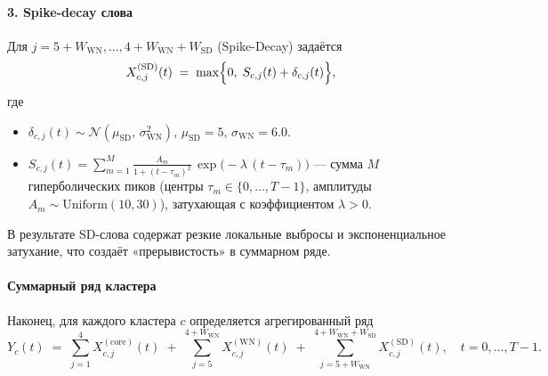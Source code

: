 \documentclass[14pt,a4paper]{article}
\begin{document}
\paragraph{3. Spike-decay слова} 
Для \(j = 5+W_{\mathrm{WN}},\dots,4+W_{\mathrm{WN}}+W_{\mathrm{SD}}\) (Spike-Decay) задаётся
\[
  X_{c,j}^{(\mathrm{SD})}(t)
  \;=\;
  \max\Bigl\{0,\;S_{c,j}(t) + \delta_{c,j}(t)\Bigr\},
\]
где 
\begin{itemize}
  \item \(\delta_{c,j}(t)\sim \mathcal{N}(\mu_{\mathrm{SD}},\,\sigma_{\mathrm{WN}}^2)\), 
    \(\mu_{\mathrm{SD}}=5, \,\sigma_{\mathrm{WN}}=6.0.\)
  \item \(S_{c,j}(t) = \displaystyle\sum_{m=1}^M \frac{A_m}{1 + (t-\tau_m)^2}\,\exp\bigl(-\lambda\,(t-\tau_m)\bigr)\) —
    сумма \(M\) гиперболических пиков (центры \(\tau_m\in\{0,\dots,T-1\}\), амплитуды \(A_m\sim\mathrm{Uniform}(10,30)\)), 
    затухающая с коэффициентом \(\lambda>0\).  
\end{itemize}
В результате SD-слова содержат резкие локальные выбросы и экспоненциальное затухание, что создаёт «прерывистость» в суммарном ряде.

\paragraph{Суммарный ряд кластера} 
Наконец, для каждого кластера \(c\) определяется агрегированный ряд
\[
  Y_c(t)
  \;=\;
  \sum_{j=1}^{4} X_{c,j}^{(\mathrm{core})}(t)
  \;+\;
  \sum_{j=5}^{4+W_{\mathrm{WN}}} X_{c,j}^{(\mathrm{WN})}(t)
  \;+\;
  \sum_{j=5+W_{\mathrm{WN}}}^{4+W_{\mathrm{WN}}+W_{\mathrm{SD}}} X_{c,j}^{(\mathrm{SD})}(t),
  \quad t=0,\dots,T-1.
\]

\end{document}
